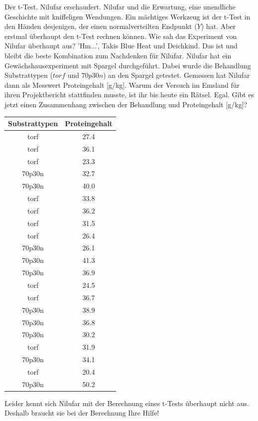 \documentclass[a4paper, 9pt]{scrartcl}\usepackage[]{graphicx}\usepackage[]{xcolor}
\begin{document}
Der t-Test. Nilufar erschaudert. Nilufar und die Erwartung, eine unendliche Geschichte mit kniffeligen Wendungen. Ein mächtiges Werkzeug ist der t-Test in den Händen desjenigen, der einen normalverteilten Endpunkt ($Y$) hat. Aber erstmal überhaupt den t-Test rechnen können. Wie sah das Experiment von Nilufar überhaupt aus? 'Hm...', Takis Blue Heat und Deichkind. Das ist und bleibt die beste Kombination zum Nachdenken für Nilufar. Nilufar hat ein Gewächshausexperiment mit Spargel durchgeführt. Dabei wurde die Behandlung Substrattypen ($torf$ und $70p30n$) an den Spargel getestet. Gemessen hat Nilufar dann als Messwert Proteingehalt [g/kg]. Warum der Versuch im Emsland für ihren Projektbericht stattfinden musste, ist ihr bis heute ein Rätsel. Egal. Gibt es jetzt einen Zusammenhang zwischen der Behandlung und Proteingehalt [g/kg]?

\begin{table}[!h]
\centering
\begin{tabular}{cc}
\toprule
Substrattypen & Proteingehalt\\
\midrule
torf & 27.4\\
torf & 36.1\\
torf & 23.3\\
70p30n & 32.7\\
70p30n & 40.0\\
\addlinespace
torf & 33.8\\
torf & 36.2\\
torf & 31.5\\
torf & 26.4\\
70p30n & 26.1\\
\addlinespace
70p30n & 41.3\\
70p30n & 36.9\\
torf & 24.5\\
torf & 36.7\\
70p30n & 38.9\\
\addlinespace
70p30n & 36.8\\
70p30n & 30.2\\
torf & 31.9\\
70p30n & 34.1\\
torf & 20.4\\
\addlinespace
70p30n & 50.2\\
\bottomrule
\end{tabular}
\end{table}



Leider kennt sich Nilufar mit der Berechnung eines t-Tests überhaupt nicht aus. Deshalb braucht sie bei der Berechnung Ihre Hilfe!
\end{document}
